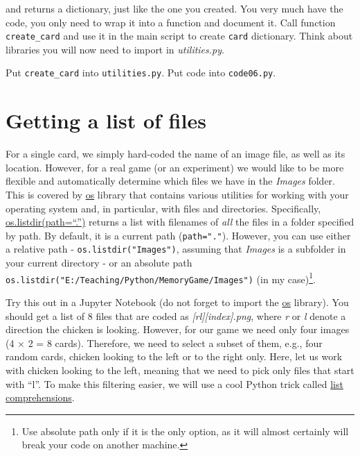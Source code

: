 \documentclass[
]{book}
\begin{document}
and returns a dictionary, just like the one you created. You very much have the code, you only need to wrap it into a function and document it. Call function \texttt{create\_card} and use it in the main script to create \texttt{card} dictionary. Think about libraries you will now need to import in \emph{utilities.py}.

Put \texttt{create\_card} into \texttt{utilities.py}.
Put code into \texttt{code06.py}.

\hypertarget{getting-a-list-of-files}{%
\section{Getting a list of files}\label{getting-a-list-of-files}}

For a single card, we simply hard-coded the name of an image file, as well as its location. However, for a real game (or an experiment) we would like to be more flexible and automatically determine which files we have in the \emph{Images} folder. This is covered by \href{https://docs.python.org/3/library/os.html}{os} library that contains various utilities for working with your operating system and, in particular, with files and directories. Specifically, \href{https://docs.python.org/3/library/os.html\#os.listdir}{os.listdir(path=``.'')} returns a list with filenames of \emph{all} the files in a folder specified by path. By default, it is a current path (\texttt{path="."}). However, you can use either a relative path - \texttt{os.listdir("Images")}, assuming that \emph{Images} is a subfolder in your current directory - or an absolute path \texttt{os.listdir("E:/Teaching/Python/MemoryGame/Images")} (in my case)\footnote{Use absolute path only if it is the only option, as it will almost certainly will break your code on another machine.}.

Try this out in a Jupyter Notebook (do not forget to import the \href{https://docs.python.org/3/library/os.html\#module-os}{os} library). You should get a list of 8 files that are coded as \emph{{[}r\textbar l{]}{[}index{]}.png}, where \emph{r} or \emph{l} denote a direction the chicken is looking. However, for our game we need only four images (4 × 2 = 8 cards). Therefore, we need to select a subset of them, e.g., four random cards, chicken looking to the left or to the right only. Here, let us work with chicken looking to the left, meaning that we need to pick only files that start with ``l''. To make this filtering easier, we will use a cool Python trick called \href{https://docs.python.org/3/tutorial/datastructures.html\#list-comprehensions}{list comprehensions}.
\end{document}
